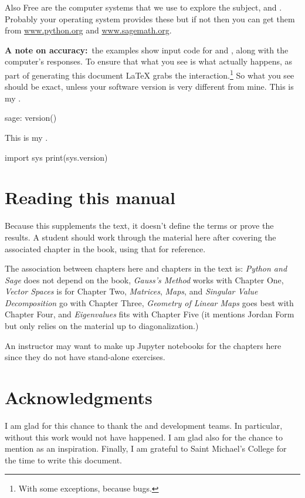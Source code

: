Also Free are the computer systems that we use to explore the subject,
\python{} and \Sage{}.
Probably your operating system provides these but if not then 
you can get them from  
\href{http://www.python.org}{\url{www.python.org}}
and 
\href{https://www.sagemath.org}{\url{www.sagemath.org}}.

\textbf{A note on accuracy:}~the examples 
show input code for \python{} and \Sage{}, 
along with the computer's responses.
To ensure that what you see is what actually happens,
as part of generating this 
document \LaTeX{} grabs the interaction.\footnote{%
  With some exceptions, because bugs.}
So what you see should be exact,
unless your software version is very different from mine.
This is my \Sage.
\begin{sagecommandline}
sage: version()  
\end{sagecommandline}
This is my \python{}. 
\begin{pythonconsole}
import sys
print(sys.version)
\end{pythonconsole}




\section{Reading this manual}
Because this supplements the text, 
it doesn't define the terms or prove the results.
A student should work through the material here after covering the associated
chapter in the book, using that for reference.

The association between chapters here and chapters in the text is:
\textit{Python and Sage} does not depend on the
book,
\textit{Gauss’s Method} works with Chapter One,
\textit{Vector Spaces} is for Chapter Two,
\textit{Matrices}, 
\textit{Maps}, and 
\textit{Singular Value Decomposition} go with Chapter Three,
\textit{Geometry of Linear Maps} goes best with Chapter Four,
and \textit{Eigenvalues} fits with Chapter Five
(it mentions Jordan Form but only relies on the material up to 
diagonalization.)

An instructor may want to make up Jupyter notebooks for the chapters here
since they do not have stand-alone exercises.




\section{Acknowledgments}
I am glad for this chance to thank the \python{} and
\Sage{} development teams.
In particular,
without \citep{SageTeam19ref} this work would not have happened.
I am glad also for the chance to mention 
\citep{Beezer11} as an inspiration.
Finally, I am grateful to Saint Michael's College for the 
time to write this document.





